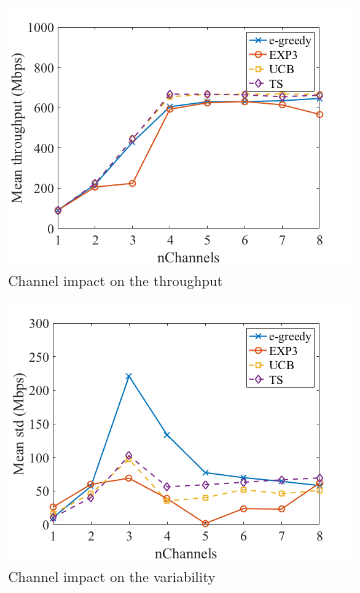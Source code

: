 \documentclass[preprint,12pt]{article}
\begin{document}
\begin{figure}[h!]
	\centering
	\begin{subfigure}[b]{.4\textwidth}
		\includegraphics[width=\textwidth]{images/impact_num_channels}
		\caption{Channel impact on the throughput}\label{fig:impact_num_channels}
	\end{subfigure}
	\begin{subfigure}[b]{.4\textwidth}
		\includegraphics[width=\textwidth]{images/impact_num_channels_on_variability}
		\caption{Channel impact on the variability}\label{fig:impact_num_channels_on_variability}
	\end{subfigure}\\
	\begin{subfigure}[b]{.4\textwidth}

\end{subfigure}
\end{figure}
\end{document}
